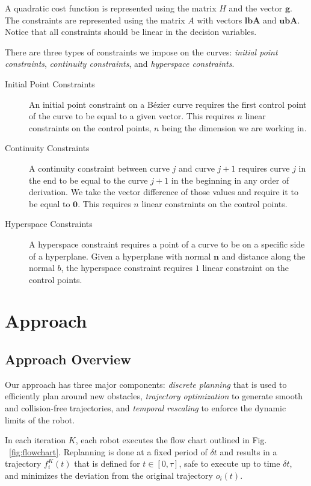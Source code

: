 \documentclass{svproc}
\newcommand{\vg}{\mathbf{g}}
\newcommand{\vzero}{\mathbf{0}}
\newcommand{\vn}{\mathbf{n}}
\newcommand{\vlbA}{\mathbf{lbA}}
\newcommand{\vubA}{\mathbf{ubA}}
\begin{document}
A quadratic cost function is represented using the matrix $H$ and the vector $\vg$. The constraints are represented using the matrix $A$ with vectors $\vlbA$ and $\vubA$.
Notice that all constraints should be linear in the decision variables.

There are three types of constraints we impose on the curves: \emph{initial point constraints}, \emph{continuity constraints}, and \emph{hyperspace constraints}.

\begin{description}
\item [Initial Point Constraints]
An initial point constraint on a B\'ezier curve requires the first control point of the curve to be equal to a given vector. This requires $n$ linear constraints on the control points, $n$ being the dimension we are working in.

\item[Continuity Constraints]
A continuity constraint between curve $j$ and curve $j+1$ requires curve $j$ in the end to be equal to the curve $j+1$ in the beginning in any order of derivation. We take the vector difference of those values and require it to be equal to $\vzero$. This requires $n$ linear constraints on the control points.

\item[Hyperspace Constraints]
A hyperspace constraint requires a point of a curve to be on a specific side of a hyperplane. Given a hyperplane with normal $\vn$ and distance along the normal $b$, the hyperspace constraint requires $1$ linear constraint on the control points.
\end{description}

\section{Approach}


\subsection{Approach Overview}
Our approach has three major components: \emph{discrete planning} that is used to efficiently plan around new obstacles, \emph{trajectory optimization} to generate smooth and collision-free trajectories, and \emph{temporal rescaling} to enforce the dynamic limits of the robot.

In each iteration $K$, each robot executes the flow chart outlined in Fig. ~\ref{fig:flowchart}. Replanning is done at a fixed period of $\delta t$ and results in a trajectory $f^K_i(t)$ that is defined for $t\in [0,\tau]$, safe to execute up to time $\delta t$, and minimizes the deviation from the original trajectory $o_i(t)$.
\end{document}
